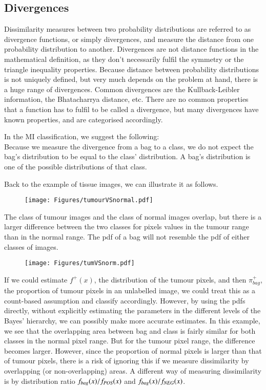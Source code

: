 \subsection{Divergences}

Dissimilarity measures between two probability distributions are referred to as divergence functions, or simply divergences, and measure the distance from one probability distribution to another. 
Divergences are not distance functions in the mathematical definition, as they don't necessarily fulfil the symmetry or the triangle inequality properties. 
Because distance between probability distributions is not uniquely defined, but very much depends on the problem at hand, there is a huge range of divergences. 
Common divergences are the Kullback-Leibler information, the Bhatacharrya distance, etc. 
There are no common properties that a function has to fulfil to be called a divergence, but many divergences have known properties, and are categorised accordingly. 

In the MI classification, we suggest the following:\\
Because we measure the divergence from a bag to a class, we do not expect the bag's distribution to be equal to the class' distribution. 
A bag's distribution is one of the possible distributions of that class. 

Back to the example of tissue images, we can illustrate it as follows. 
\begin{figure}[!h]
  \centering
    \texttt{[image: Figures/tumourVSnormal.pdf]}
\end{figure}
The class of tumour images and the class of normal images overlap, but there is a larger difference between the two classes for pixels values in the tumour range than in the normal range. 
The pdf of a bag will not resemble the pdf of either classes of images. 
\begin{figure}[!h]
  \centering
    \texttt{[image: Figures/tumVSnorm.pdf]}
\end{figure}

If we could estimate $f^+(x)$, the distribution of the tumour pixels, and then $\pi_{bag}^+$, the proportion of tumour pixels in an unlabelled image, we could treat this as a count-based assumption and classify accordingly. 
However, by using the pdfs directly, without explicitly estimating the parameters in the different levels of the Bayes' hierarchy, we can possibly make more accurate estimates. 
In this example, we see that the overlapping area between bag and class is fairly similar for both classes in the normal pixel range. 
But for the tumour pixel range, the difference becomes larger. 
However, since the proportion of normal pixels is larger than that of tumour pixels, there is a risk of ignoring this if we measure dissimilarity by overlapping (or non-overlapping) areas.
A different way of measuring dissimilarity is by distribution ratio $f_{bag}(x) /f_{\text{\scriptsize{{\it POS}}}}(x)$ and $f_{bag}(x) /f_{\text{\scriptsize{{\it NEG}}}}(x)$.








